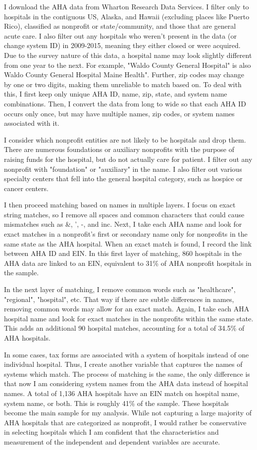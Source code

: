 \documentclass[12pt]{article}
\begin{document}
I download the AHA data from Wharton Research Data Services. I filter only to hospitals in the contiguous US, Alaska, and Hawaii (excluding places like Puerto Rico), classified as nonprofit or state/community, and those that are general acute care. I also filter out any hospitals who weren't present in the data (or change system ID) in 2009-2015, meaning they either closed or were acquired. Due to the survey nature of this data, a hospital name may look slightly different from one year to the next. For example, "Waldo County General Hospital" is also Waldo County General Hospital Maine Health". Further, zip codes may change by one or two digits, making them unreliable to match based on. To deal with this, I first keep only unique AHA ID, name, zip, state, and system name combinations. Then, I convert the data from long to wide so that each AHA ID occurs only once, but may have multiple names, zip codes, or system names associated with it.

I consider which nonprofit entities are not likely to be hospitals and drop them. There are numerous foundations or auxiliary nonprofits with the purpose of raising funds for the hospital, but do not actually care for patient. I filter out any nonprofit with "foundation" or "auxiliary" in the name. I also filter out various specialty centers that fell into the general hospital category, such as hospice or cancer centers. 

I then proceed matching based on names in multiple layers. I focus on exact string matches, so I remove all spaces and common characters that could cause mismatches such as \&, ', -, and inc. Next, I take each AHA name and look for exact matches in a nonprofit's first or secondary name only for nonprofits in the same state as the AHA hospital. When an exact match is found, I record the link between AHA ID and EIN. In this first layer of matching, 860 hospitals in the AHA data are linked to an EIN, equivalent to 31\% of AHA nonprofit hospitals in the sample. 

In the next layer of matching, I remove common words such as "healthcare", "regional", "hospital", etc. That way if there are subtle differences in names, removing common words may allow for an exact match. Again, I take each AHA hospital name and look for exact matches in the nonprofits within the same state. This adds an additional 90 hospital matches, accounting for a total of 34.5\% of AHA hospitals. 

In some cases, tax forms are associated with a system of hospitals instead of one individual hospital. Thus, I create another variable that captures the names of systems which match. The process of matching is the same, the only difference is that now I am considering system names from the AHA data instead of hospital names. A total of 1,136 AHA hospitals have an EIN match on hospital name, system name, or both. This is roughly 41\% of the sample. These hospitals become the main sample for my analysis. While not capturing a large majority of AHA hospitals that are categorized as nonprofit, I would rather be conservative in selecting hospitals which I am confident that the characteristics and measurement of the independent and dependent variables are accurate. 
\end{document}
